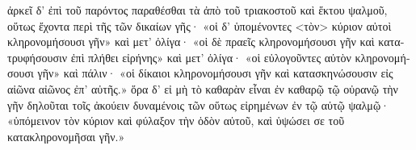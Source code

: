 \begin{greek}
ἀρκεῖ δ' ἐπὶ τοῦ παρόντος παραθέσθαι τὰ ἀπὸ τοῦ τριακοστοῦ καὶ ἕκτου ψαλμοῦ, οὕτως ἔχοντα περὶ τῆς τῶν δικαίων γῆς· «οἱ δ' ὑπομένοντες <τὸν> κύριον αὐτοὶ κληρονομήσουσι γῆν» καὶ μετ' ὀλίγα· «οἱ δὲ πραεῖς κληρονομήσουσι γῆν καὶ κατατρυφήσουσιν ἐπὶ πλήθει εἰρήνης» καὶ μετ' ὀλίγα· «οἱ εὐλογοῦντες αὐτὸν κληρονομήσουσι γῆν» καὶ πάλιν· «οἱ δίκαιοι κληρονομήσουσι γῆν καὶ κατασκηνώσουσιν εἰς αἰῶνα αἰῶνος ἐπ' αὐτῆς.» ὅρα δ' εἰ μὴ τὸ καθαρὰν εἶναι ἐν καθαρῷ τῷ οὐρανῷ τὴν γῆν δηλοῦται τοῖς ἀκούειν δυναμένοις τῶν οὕτως εἰρημένων ἐν τῷ αὐτῷ ψαλμῷ· «ὑπόμεινον τὸν κύριον καὶ φύλαξον τὴν ὁδὸν αὐτοῦ, καὶ ὑψώσει σε τοῦ κατακληρονομῆσαι γῆν.»

\end{greek}